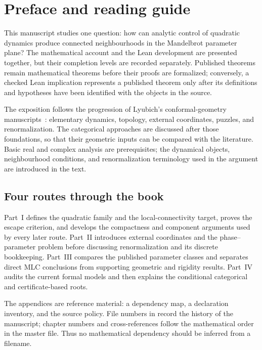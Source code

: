 \chapter{Preface and reading guide}

This manuscript studies one question: how can analytic control of quadratic
dynamics produce connected neighbourhoods in the Mandelbrot parameter
plane?  The mathematical account and the Lean development are presented
together, but their completion levels are recorded separately.  Published
theorems remain mathematical theorems before their proofs are formalized;
conversely, a checked Lean implication represents a published theorem only
after its definitions and hypotheses have been identified with the
objects in the source.

The exposition follows the progression of Lyubich's conformal-geometry
manuscripts~\cite{LyubichBook,LyubichNotes}: elementary dynamics, topology,
external coordinates, puzzles, and renormalization.  The categorical
approaches are discussed after those foundations, so that their geometric
inputs can be compared with the literature.  Basic real and complex
analysis are prerequisites; the dynamical objects, neighbourhood
conditions, and renormalization terminology used in the argument are
introduced in the text.

\section*{Four routes through the book}

Part~I defines the quadratic family and the local-connectivity target,
proves the escape criterion, and develops the compactness and component
arguments used by every later route.  Part~II introduces external
coordinates and the phase--parameter problem before discussing
renormalization and its discrete bookkeeping.  Part~III compares the
published parameter classes and separates direct MLC conclusions from
supporting geometric and rigidity results.  Part~IV audits the current
formal models and then explains the conditional categorical and
certificate-based roots.

The appendices are reference material: a dependency map, a declaration
inventory, and the source policy.  File numbers in
 record the history of the manuscript; chapter numbers
and cross-references follow the mathematical order in the master file.
Thus no mathematical dependency should be inferred from a filename.

